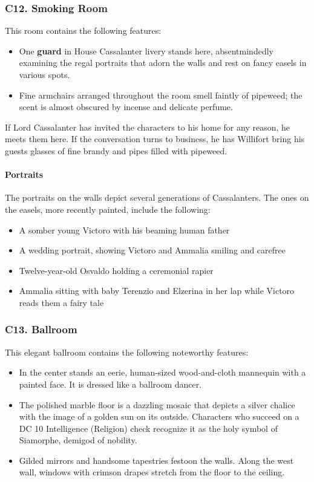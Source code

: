\documentclass[10pt,a4paper,twoside,twocolumn,openany,nodeprecatedcode]{dndbook}
\begin{document}
\subsubsection{C12. Smoking Room}
This room contains the following features:
\begin{itemize}

\item One \textbf{guard} in House Cassalanter livery stands here, absentmindedly examining the regal portraits that adorn the walls and rest on fancy easels in various spots.
\item Fine armchairs arranged throughout the room smell faintly of pipeweed; the scent is almost obscured by incense and delicate perfume.
\end{itemize}


If Lord Cassalanter has invited the characters to his home for any reason, he meets them here. If the conversation turns to business, he has Willifort bring his guests glasses of fine brandy and pipes filled with pipeweed.
\paragraph{Portraits}
The portraits on the walls depict several generations of Cassalanters. The ones on the easels, more recently painted, include the following:
\begin{itemize}

\item A somber young Victoro with his beaming human father
\item A wedding portrait, showing Victoro and Ammalia smiling and carefree
\item Twelve-year-old Osvaldo holding a ceremonial rapier
\item Ammalia sitting with baby Terenzio and Elzerina in her lap while Victoro reads them a fairy tale
\end{itemize}


\subsubsection{C13. Ballroom}
This elegant ballroom contains the following noteworthy features:
\begin{itemize}

\item In the center stands an eerie, human-sized wood-and-cloth mannequin with a painted face. It is dressed like a ballroom dancer.
\item The polished marble floor is a dazzling mosaic that depicts a silver chalice with the image of a golden sun on its outside. Characters who succeed on a DC 10 Intelligence (Religion) check recognize it as the holy symbol of Siamorphe, demigod of nobility.
\item Gilded mirrors and handsome tapestries festoon the walls. Along the west wall, windows with crimson drapes stretch from the floor to the ceiling.
\end{itemize}
\end{document}
